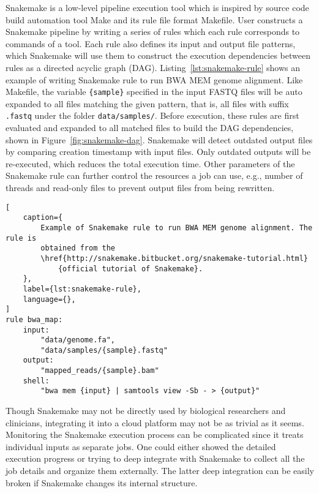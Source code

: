 Snakemake \cite{koster2012:snakemakea} is a low-level pipeline execution tool
which is inspired by source code build automation tool Make \cite{:gnu-make}
and its rule file format Makefile. User constructs a Snakemake pipeline by
writing a series of rules which each rule corresponds to commands of a tool.
Each rule also defines its input and output file patterns, which Snakemake will
use them to construct the execution dependencies between rules as a directed
acyclic graph (DAG). Listing~\ref{lst:snakemake-rule} shows an example of
writing Snakemake rule to run BWA MEM genome alignment. Like Makefile, the
variable \texttt{\{sample\}} specified in the input FASTQ files will be auto
expanded to all files matching the given pattern, that is, all files with
suffix \texttt{.fastq} under the folder \texttt{data/samples/}.  Before
execution, these rules are first evaluated and expanded to all matched files to
build the DAG dependencies, shown in Figure~\ref{fig:snakemake-dag}.  Snakemake
will detect outdated output files by comparing creation timestamp with input
files. Only outdated outputs will be re-executed, which reduces the total
execution time. Other parameters of the Snakemake rule can further control the
resources a job can use, e.g., number of threads and read-only files to prevent
output files from being rewritten.

\begin{lstlisting}[
    caption={
        Example of Snakemake rule to run BWA MEM genome alignment. The rule is
        obtained from the
        \href{http://snakemake.bitbucket.org/snakemake-tutorial.html}
            {official tutorial of Snakemake}.
    },
    label={lst:snakemake-rule},
    language={},
]
rule bwa_map:
    input:
        "data/genome.fa",
        "data/samples/{sample}.fastq"
    output:
        "mapped_reads/{sample}.bam"
    shell:
        "bwa mem {input} | samtools view -Sb - > {output}"
\end{lstlisting}



Though Snakemake may not be directly used by biological researchers and
clinicians, integrating it into a cloud platform may not be as trivial as
it seems. Monitoring the Snakemake execution process can be complicated since
it treats individual inputs as separate jobs. One could either showed the
detailed execution progress or trying to deep integrate with Snakemake to
collect all the job details and organize them externally. The latter deep
integration can be easily broken if Snakemake changes its internal structure.

